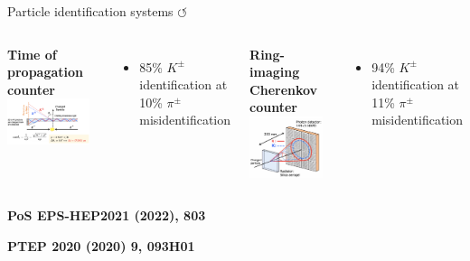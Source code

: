 \documentclass[xcolor=dvipsnames]{beamer}
\begin{document}
\begin{frame}{Particle identification systems \hyperlink{frame:A}{$\circlearrowleft$}}
   \scriptsize
   \begin{columns}
      \centering
      \textbf{Time of propagation counter}
         \includegraphics[width=0.9\textwidth]{figures/top_schematic.png}
         \begin{itemize}
            \item 85\% $K^{\pm}$ identification at 10\% $\pi^{\pm}$ misidentification
         \end{itemize}
      \textbf{Ring-imaging Cherenkov counter}
         \includegraphics[width=0.9\textwidth]{figures/arich_schematic.png}
         \begin{itemize}
            \item 94\% $K^{\pm}$ identification at 11\% $\pi^{\pm}$ misidentification
         \end{itemize}
   \end{columns}
   \begin{flushright}
     \tiny \textbf{PoS EPS-HEP2021 (2022), 803}

      \tiny \textbf{PTEP 2020 (2020) 9, 093H01}
   \end{flushright}
\end{frame}
\end{document}
